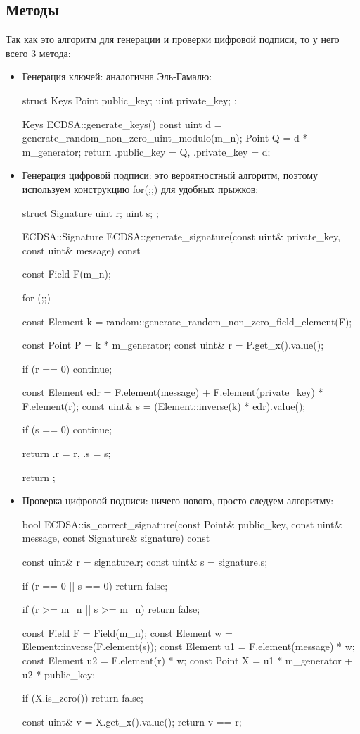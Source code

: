 \subsection{Методы}
Так как это алгоритм для генерации и проверки цифровой подписи, то у него всего 3 метода:
\begin{itemize}
  \item Генерация ключей: аналогична Эль-Гамалю:
  \begin{cppcode}
struct Keys {
    Point public_key;
    uint private_key;
};

Keys ECDSA::generate_keys() const {
    uint d = generate_random_non_zero_uint_modulo(m_n);
    Point Q = d * m_generator;
    return {.public_key = Q, .private_key = d};
}
  \end{cppcode}
  \item Генерация цифровой подписи: это вероятностный алгоритм, поэтому используем конструкцию for(;;) для удобных прыжков:
  \begin{cppcode}
struct Signature {
    uint r;
    uint s;
};

ECDSA::Signature ECDSA::generate_signature(const uint& private_key, const uint& message) const {
    const Field F(m_n);

    for (;;) {
        const Element k = random::generate_random_non_zero_field_element(F);

        const Point P = k * m_generator;
        const uint& r = P.get_x().value();

        if (r == 0) {
            continue;
        }

        const Element edr = F.element(message) + F.element(private_key) * F.element(r);
        const uint& s = (Element::inverse(k) * edr).value();

        if (s == 0) {
            continue;
        }

        return {.r = r, .s = s};
    }

    return {};
}
  \end{cppcode}
  \item Проверка цифровой подписи: ничего нового, просто следуем алгоритму:
  \begin{cppcode}
bool ECDSA::is_correct_signature(const Point& public_key, const uint& message,
                                 const Signature& signature) const {
    const uint& r = signature.r;
    const uint& s = signature.s;

    if (r == 0 || s == 0) {
        return false;
    }

    if (r >= m_n || s >= m_n) {
        return false;
    }

    const Field F = Field(m_n);
    const Element w = Element::inverse(F.element(s));
    const Element u1 = F.element(message) * w;
    const Element u2 = F.element(r) * w;
    const Point X = u1 * m_generator + u2 * public_key;

    if (X.is_zero()) {
        return false;
    }

    const uint& v = X.get_x().value();
    return v == r;
}
  \end{cppcode}
\end{itemize}

